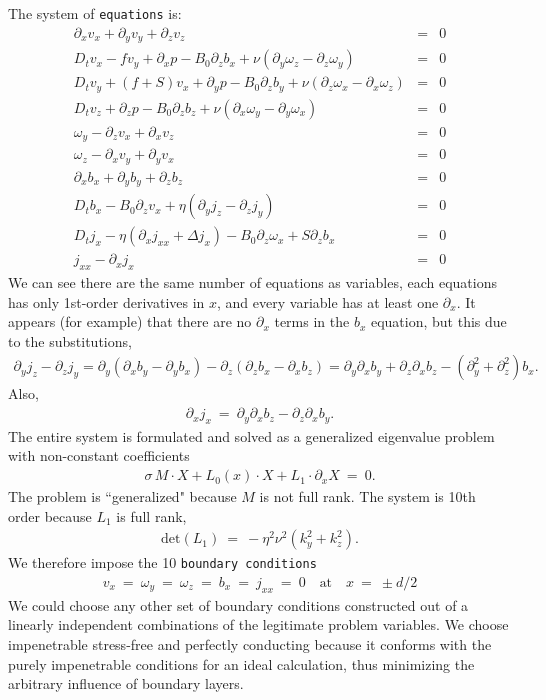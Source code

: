 \documentclass[aps,prl,preprint
,superscriptaddress]{revtex4-1}
\newcommand\Beq{\begin{eqnarray}}
\newcommand\Eeq{\end{eqnarray}}
\newcommand{\pd}[1]{\partial_{#1}}
\begin{document}
The system of \texttt{equations} is:
\Beq\label{u-eq}
\pd{x} v_{x} + \pd{y} v_{y} + \pd{z} v_{z}  &=& 0\\
D_{t} v_{x}  - f v_{y} + \pd{x} p - B_{0} \pd{z} b_{x}  + \nu ( \pd{y} \omega_{z} - \pd{z} \omega_{y}) &=& 0\\
D_{t} v_{y}  + (f+S) v_{x} + \pd{y} p - B_{0} \pd{z} b_{y} + \nu ( \pd{z} \omega_{x} - \pd{x} \omega_{z})&=& 0\label{v-eq} \\
D_{t} v_{z} + \pd{z} p - B_{0} \pd{z} b_{z} + \nu ( \pd{x} \omega_{y} - \pd{y} \omega_{x})&=& 0 \\
\omega_{y} - \pd{z} v_{x} + \pd{x} v_{z} &=& 0 \\
\omega_{z} - \pd{x} v_{y} + \pd{y} v_{x} &=& 0 \\
\pd{x} b_{x} + \pd{y} b_{y} + \pd{z} b_{z}   &=& 0\\
D_{t} b_{x} - B_{0} \pd{z} v_{x} + \eta ( \pd{y} j_{z} - \pd{z} j_{y})&=& 0\\
D_{t} j_{x}  - \eta( \pd{x}j_{xx} +  \Delta j_{x} )  - B_{0} \pd{z} \omega_{x} + S \pd{z} b_{x} &=& 0\\
j_{xx} - \pd{x} j_{x} &=& 0
\Eeq
We can see there are the same number of equations as variables, each equations has only 1st-order derivatives in $x$, and every variable has at least one $\pd{x}$. 
It appears (for example) that there are no $\pd{x}$ terms in the $b_{x}$ equation, but this due to the substitutions, 
\Beq
\pd{y} j_{z} - \pd{z} j_{y} =  \pd{y}(\pd{x} b_{y} - \pd{y} b_{x}) - \pd{z}(\pd{z} b_{x} - \pd{x} b_{z})  =  \pd{y}\pd{x}b_{y} + \pd{z}\pd{x}b_{z} - (\pd{y}^{2} + \pd{z}^{2})b_{x}.
\Eeq
Also,
\Beq
\pd{x}j_{x} \ = \ \pd{y} \pd{x} b_{z} - \pd{z} \pd{x}b_{y}.
\Eeq
The entire system is formulated and solved as a generalized eigenvalue problem with non-constant coefficients 
\Beq
\sigma \, M \cdot X + L_{0}(x) \cdot X + L_{1}\cdot \pd{x} X \ = \ 0.
\Eeq
The problem is ``generalized" because $M$ is not full rank. The system is 10th order because $L_{1}$ is full rank,
\Beq
\text{det}(L_{1}) \ = \ -\eta ^2 \nu ^2 \left(k_y^2+k_z^2\right).
\Eeq
We therefore impose the 10 \texttt{boundary conditions} 
\Beq
v_{x} \ = \ \omega_{y} \ = \ \omega_{z} \ = \ b_{x} \ = \ j_{xx} \ = \ 0 \quad \text{at} \quad x \ = \ \pm d/2
\Eeq
We could choose any other set of boundary conditions constructed out of a linearly independent combinations of the legitimate problem variables. 
We choose impenetrable stress-free and perfectly conducting because it conforms with the purely impenetrable conditions for an ideal calculation, thus minimizing the arbitrary influence of boundary layers.
\end{document}

